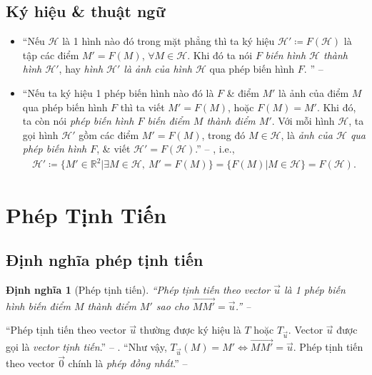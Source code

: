\documentclass[oneside]{book}
\numberwithin{equation}{section}
\newtheorem{dinhnghia}{Định nghĩa}[section]
\begin{document}
\subsection{Ký hiệu \& thuật ngữ}
\begin{itemize}
	\item ``Nếu $\mathcal{H}$ là 1 hình nào đó trong mặt phẳng thì ta ký hiệu $\mathcal{H}'\coloneqq F(\mathcal{H})$ là tập các điểm $M' = F(M)$, $\forall M\in\mathcal{H}$. Khi đó ta nói $F$ \textit{biến hình $\mathcal{H}$ thành hình $\mathcal{H}'$}, hay \textit{hình $\mathcal{H}'$ là ảnh của hình $\mathcal{H}$} qua phép biến hình $F$.
	'' -- \cite[p. 4]{SGK_Toan_11_hinh_hoc_co_ban}
	\item ``Nếu ta ký hiệu 1 phép biến hình nào đó là $F$ \& điểm $M'$ là ảnh của điểm $M$ qua phép biến hình $F$ thì ta viết $M' = F(M)$, hoặc $F(M) = M'$. Khi đó, ta còn nói \textit{phép biến hình $F$ biến điểm $M$ thành điểm $M'$}. Với mỗi hình $\mathcal{H}$, ta gọi hình $\mathcal{H}'$ gồm các điểm $M' = F(M)$, trong đó $M\in\mathcal{H}$, là \textit{ảnh của $\mathcal{H}$ qua phép biến hình $F$}, \& viết $\mathcal{H}' = F(\mathcal{H})$.'' -- \cite[p. 5]{SGK_Toan_11_hinh_hoc_nang_cao}, i.e.,
	\begin{align*}
		\mathcal{H}'\coloneqq\{M'\in\mathbb{R}^2|\exists M\in\mathcal{H},\ M' = F(M)\} = \{F(M)|M\in\mathcal{H}\} = F(\mathcal{H}).
	\end{align*}
\end{itemize}

\section{Phép Tịnh Tiến}

\subsection{Định nghĩa phép tịnh tiến}

\begin{dinhnghia}[Phép tịnh tiến]
	``\emph{Phép tịnh tiến} theo vector $\vec{u}$ là 1 phép biến hình biến điểm $M$ thành điểm $M'$ sao cho $\overrightarrow{MM'} = \vec{u}$.'' -- \cite[p. 5]{SGK_Toan_11_hinh_hoc_nang_cao}
\end{dinhnghia}
``Phép tịnh tiến theo vector $\vec{u}$ thường được ký hiệu là $T$ hoặc $T_{\vec{u}}$. Vector $\vec{u}$ được gọi là \textit{vector tịnh tiến}.'' -- \cite[p. 5]{SGK_Toan_11_hinh_hoc_nang_cao}. ``Như vậy, $T_{\vec{u}}(M) = M'\Leftrightarrow\overrightarrow{MM'} = \vec{u}$. Phép tịnh tiến theo vector $\vec{0}$ chính là \textit{phép đồng nhất}.'' -- \cite[p. 5]{SGK_Toan_11_hinh_hoc_co_ban}
\end{document}

